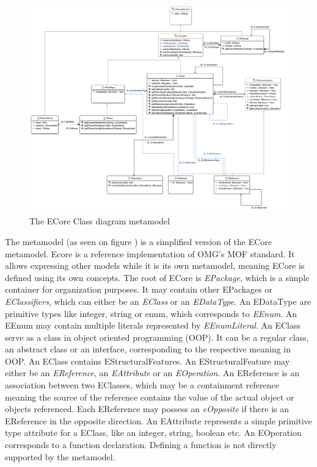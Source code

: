 \begin{figure}[!ht]
\centering
\includegraphics[width=160mm, keepaspectratio]{figures/ecore_diagram.png}
\caption{The ECore Class diagram metamodel}
\label{fig:metamodel}
\end{figure}

The metamodel (as seen on figure ) is a simplified version of
the ECore metamodel. Ecore is a reference implementation of OMG's MOF
standard. It allows expressing other models while it is its own metamodel,
meaning ECore is defined using its own concepts. The root of ECore is
\emph{EPackage}, which is a simple container for organization purposes. It
may contain other EPackages or \emph{EClassifiers}, which can either
be an \emph{EClass} or an \emph{EDataType}. An EDataType are primitive types
like integer, string or enum, which corresponds to \emph{EEnum}. An EEnum may
contain multiple literals represented by \emph{EEnumLiteral}. An EClass serve as
a class in object oriented programming (OOP). It can be a regular class, an
abstract class or an interface, corresponding to the respective meaning in OOP.
An EClass contains EStructuralFeatures. An EStructuralFeature may either be an
\emph{EReference}, an \emph{EAttribute} or an \emph{EOperation}. An EReference
is an association between two EClasses, which may be a containment reference
meaning the source of the reference contains the value of the actual object or
objects referenced. Each EReference may possess an \emph{eOpposite} if there is
an EReference in the opposite direction. An EAttribute represents a simple
primitive type attribute for a EClass, like an integer, string, boolean etc. An
EOperation corresponds to a function declaration. Defining a function is not
directly supported by the metamodel.

